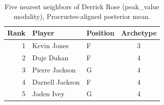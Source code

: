 \begin{table}[htbp]
  \centering\small
  \begin{tabular}{rllc}
    \toprule
    Rank & Player & Position & Archetype \\
    \midrule
    1 & Kevin Jones & F & 3 \\
    2 & Duje Dukan & F & 4 \\
    3 & Pierre Jackson & G & 4 \\
    4 & Darnell Jackson & F & 4 \\
    5 & Jaden Ivey & G & 4 \\
    \bottomrule
  \end{tabular}
  \caption{Five nearest neighbors of Derrick Rose (peak_value modality), Procrustes-aligned posterior mean.}
  \label{tab:Derrick_Rose_neighbors_peak_value}
\end{table}

